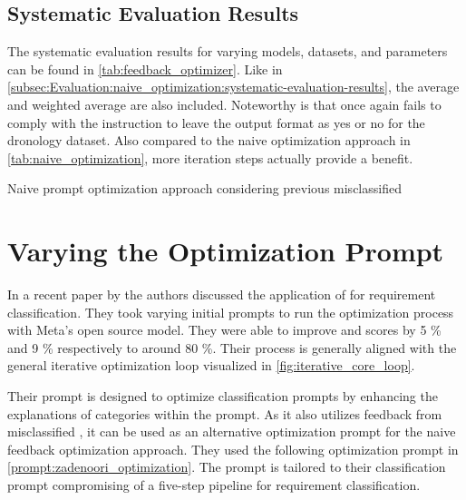 \subsection{Systematic Evaluation Results}
\label{subsec:Evaluation:simple_feedback_optimization:systematic-evaluation-results}

The systematic evaluation results for varying models, datasets, and parameters can be found in \autoref{tab:feedback_optimizer}.
Like in \autoref{subsec:Evaluation:naive_optimization:systematic-evaluation-results}, the average and weighted average are also included.
Noteworthy is that \llama once again fails to comply with the instruction to leave the output format as \textquotesingle yes \textquotesingle or \textquotesingle no \textquotesingle for the dronology dataset. 
Also compared to the naive optimization approach in \autoref{tab:naive_optimization}, more iteration steps actually provide a benefit.

\begin{landscape}
    \begin{table}
        \centering
        \renewcommand{\arraystretch}{1}
        
        \renewcommand{\arraystretch}{1}
        \caption{Naive prompt optimization approach considering previous misclassified \TLs}
        \label{tab:feedback_optimizer}
    \end{table}
\end{landscape}


\section{Varying the Optimization Prompt}
\label{sec:Evaluation:varying-the-optimization-prompt}
In a recent paper by  the authors discussed the application of \APE for requirement classification.
They took varying initial prompts to run the optimization process with Meta's open source \llama model.
They were able to improve \fone and \ftwo scores by 5 \% and 9 \% respectively to around 80 \%.
Their \APE process is generally aligned with the general iterative optimization loop visualized in \autoref{fig:iterative_core_loop}.

Their prompt is designed to optimize classification prompts by enhancing the explanations of categories within the prompt.
As it also utilizes feedback from misclassified \TLs, it can be used as an alternative optimization prompt for the naive feedback optimization approach.
They used the following optimization prompt in \autoref{prompt:zadenoori_optimization}.
The prompt is tailored to their \CoT classification prompt compromising of a five-step pipeline for requirement classification.

